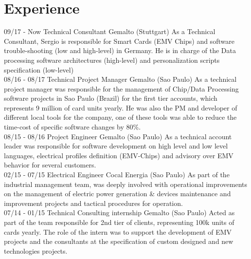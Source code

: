 \documentclass[]{friggeri-cv}
\begin{document}
\section{Experience}
\begin{entrylist}
  \entry
    {09/17 - Now}
    {Technical Consultant}
    {\normalsize{Gemalto (Stuttgart)}}
    {As a Technical Consultant, Sergio is responsible for Smart Cards (EMV Chips) and software trouble-shooting (low and high-level) in Germany. He is in charge of the Data processing software architectures (high-level) and personalization scripts specification (low-level)\\}
  \entry
    {08/16 - 08/17}
    {Technical Project Manager}
    {\normalsize{Gemalto (Sao Paulo)}}
    {As a technical project manager was responsible for the management of Chip/Data Processing software projects in Sao Paulo (Brazil) for the first tier accounts, which represents 9 million of card units yearly. He was also the PM and developer of different local tools for the company, one of these tools was able to reduce the time-cost of specific software changes by 80\%.\\}
    \entry
    {08/15 - 08/16}
    {Project Engineer}
    {\normalsize{Gemalto (Sao Paulo)}}
    {As a technical account leader was responsible for software development on high level and low level languages, electrical profiles definition (EMV-Chips) and advisory over EMV behavior for several customers. \\}
    \entry
    {02/15 - 07/15}
    {Electrical Engineer}
    {\normalsize{Cocal Energia (Sao Paulo)}}
    {As part of the industrial management team, was deeply involved with operational improvements on the management of electric power generation \& devices maintenance and improvement projects and tactical procedures for operation.\\}
    \entry
    {07/14 - 01/15}
    {Technical Consulting internship}
    {\normalsize{Gemalto (Sao Paulo)}}
    {Acted as part of the team responsible for 2nd tier of clients, representing 100k units of cards yearly. The role of the intern was to support the development of EMV projects and the consultants at the specification of custom designed and new technologies projects. \\}
\end{entrylist}
\end{document}
